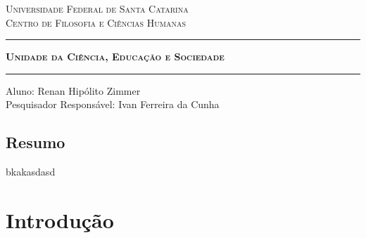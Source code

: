 \documentclass[12pt]{report}
\begin{document}
	
	\begin{center}
		\vspace*{-3cm}
		\textsc{Universidade Federal de Santa Catarina} \\
		\textsc{Centro de Filosofia e Ciências Humanas}
		
		\vspace{1cm}
		\rule{411pt}{1.3pt}
		\vspace{0.2cm}
		
		\Large \textbf{\textsc{Unidade da Ciência, Educação e Sociedade}}
		
		\rule{411pt}{1.3pt}
		\vspace{1cm}
		
		Aluno: Renan Hipólito Zimmer\\
		\vspace{0.5cm}
		Pesquisador Responsável: Ivan Ferreira da Cunha
		
		\vspace{1cm}
	\end{center}
	
	
	\vspace{-0.5cm}
	\section*{Resumo}
		bkakasdasd
		
	\newpage
	\vspace*{-3cm}
	\onehalfspacing
	\chapter*{Introdução}
	
		\vspace{-0.75cm}
\end{document}
